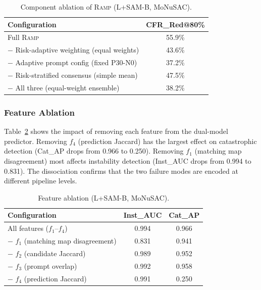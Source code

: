 \documentclass[10pt,twocolumn,letterpaper]{article}
\newcommand{\RAMP}{\textsc{Ramp}}
\begin{document}
\begin{table}[t]
\centering
\caption{Component ablation of \RAMP{} (L+SAM-B, MoNuSAC).}
\label{tab:abl_comp}
\small
\begin{tabular}{lc}
\toprule
\textbf{Configuration} & \textbf{CFR\_Red@80\%}\\
\midrule
Full \RAMP{}                           & 55.9\%\\
$-$ Risk-adaptive weighting (equal weights)    & 43.6\%\\
$-$ Adaptive prompt config (fixed P30-N0)      & 37.2\%\\
$-$ Risk-stratified consensus (simple mean)    & 47.5\%\\
$-$ All three (equal-weight ensemble)          & 38.2\%\\
\bottomrule
\end{tabular}
\end{table}

\subsubsection{Feature Ablation}

Table~\ref{tab:abl_feat} shows the impact of removing each feature from the
dual-model predictor. Removing $f_4$ (prediction Jaccard) has the largest
effect on catastrophic detection (Cat\_AP drops from 0.966 to 0.250).
Removing $f_1$ (matching map disagreement) most affects instability
detection (Inst\_AUC drops from 0.994 to 0.831). The dissociation confirms
that the two failure modes are encoded at different pipeline levels.

\begin{table}[t]
\centering
\caption{Feature ablation (L+SAM-B, MoNuSAC).}
\label{tab:abl_feat}
\small
\begin{tabular}{lcc}
\toprule
\textbf{Configuration} & \textbf{Inst\_AUC} & \textbf{Cat\_AP}\\
\midrule
All features ($f_1$--$f_4$)    & 0.994 & 0.966\\
$-$ $f_1$ (matching map disagreement) & 0.831 & 0.941\\
$-$ $f_2$ (candidate Jaccard)        & 0.989 & 0.952\\
$-$ $f_3$ (prompt overlap)           & 0.992 & 0.958\\
$-$ $f_4$ (prediction Jaccard)       & 0.991 & 0.250\\
\bottomrule
\end{tabular}
\end{table}
\end{document}
